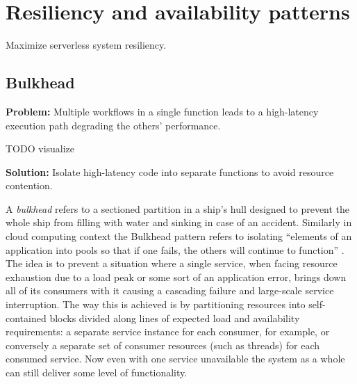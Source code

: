 \section{Resiliency and availability patterns} \label{sec:resiliencyPatterns}

Maximize serverless system resiliency.

\subsection{Bulkhead} \label{subsec:Bulkhead}

\textbf{Problem:} Multiple workflows in a single function leads to a high-latency execution path degrading the others' performance.

TODO visualize

\textbf{Solution:} Isolate high-latency code into separate functions to avoid resource contention.

A \textit{bulkhead} refers to a sectioned partition in a ship's hull designed to prevent the whole ship from filling with water and sinking in case of an accident. Similarly in cloud computing context the Bulkhead pattern refers to isolating ``elements of an application into pools so that if one fails, the others will continue to function'' \parencite{microsoft18cloudPatterns}. The idea is to prevent a situation where a single service, when facing resource exhaustion due to a load peak or some sort of an application error, brings down all of its consumers with it causing a cascading failure and large-scale service interruption. The way this is achieved is by partitioning resources into self-contained blocks divided along lines of expected load and availability requirements: a separate service instance for each consumer, for example, or conversely a separate set of consumer resources (such as threads) for each consumed service. Now even with one service unavailable the system as a whole can still deliver some level of functionality.

